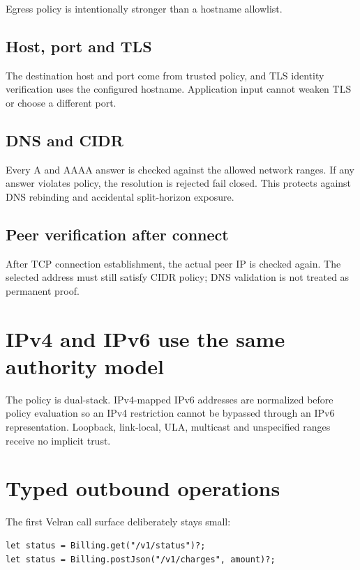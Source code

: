 Egress policy is intentionally stronger than a hostname allowlist.

\subsection*{Host, port and TLS}

The destination host and port come from trusted policy, and TLS identity verification uses the configured hostname. Application input cannot weaken TLS or choose a different port.

\subsection*{DNS and CIDR}

Every A and AAAA answer is checked against the allowed network ranges. If any answer violates policy, the resolution is rejected fail closed. This protects against DNS rebinding and accidental split-horizon exposure.

\subsection*{Peer verification after connect}

After TCP connection establishment, the actual peer IP is checked again. The selected address must still satisfy CIDR policy; DNS validation is not treated as permanent proof.

\section{IPv4 and IPv6 use the same authority model}

The policy is dual-stack. IPv4-mapped IPv6 addresses are normalized before policy evaluation so an IPv4 restriction cannot be bypassed through an IPv6 representation. Loopback, link-local, ULA, multicast and unspecified ranges receive no implicit trust.

\section{Typed outbound operations}

The first Velran call surface deliberately stays small:

\begin{lstlisting}[language=Velran]
let status = Billing.get("/v1/status")?;
let status = Billing.postJson("/v1/charges", amount)?;
\end{lstlisting}

